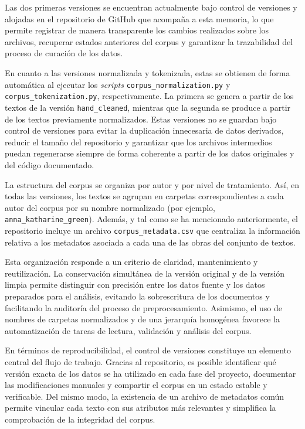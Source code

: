 \documentclass[IB]{TFUOC}%
\begin{document}
Las dos primeras versiones se encuentran actualmente bajo control de versiones y alojadas en el repositorio de GitHub que acompaña a esta memoria, lo que permite registrar de manera transparente los cambios realizados sobre los archivos, recuperar estados anteriores del corpus y garantizar la trazabilidad del proceso de curación de los datos.

En cuanto a las versiones normalizada y tokenizada, estas se obtienen de forma automática al ejecutar los \textit{scripts} \texttt{corpus\_normalization.py} y \texttt{corpus\_tokenization.py}, respectivamente. La primera se genera a partir de los textos de la versión \texttt{hand\_cleaned}, mientras que la segunda se produce a partir de los textos previamente normalizados. Estas versiones no se guardan bajo control de versiones para evitar la duplicación innecesaria de datos derivados, reducir el tamaño del repositorio y garantizar que los archivos intermedios puedan regenerarse siempre de forma coherente a partir de los datos originales y del código documentado.

La estructura del corpus se organiza por autor y por nivel de tratamiento. Así, en todas las versiones, los textos se agrupan en carpetas correspondientes a cada autor del corpus por su nombre normalizado (por ejemplo, \texttt{anna\_katharine\_green}). Además, y tal como se ha mencionado anteriormente, el repositorio incluye un archivo \texttt{corpus\_metadata.csv} que centraliza la información relativa a los metadatos asociada a cada una de las obras del conjunto de textos.

Esta organización responde a un criterio de claridad, mantenimiento y reutilización. La conservación simultánea de la versión original y de la versión limpia permite distinguir con precisión entre los datos fuente y los datos preparados para el análisis, evitando la sobrescritura de los documentos y facilitando la auditoría del proceso de preprocesamiento. Asimismo, el uso de nombres de carpetas normalizados y de una jerarquía homogénea favorece la automatización de tareas de lectura, validación y análisis del corpus.

En términos de reproducibilidad, el control de versiones constituye un elemento central del flujo de trabajo. Gracias al repositorio, es posible identificar qué versión exacta de los datos se ha utilizado en cada fase del proyecto, documentar las modificaciones manuales y compartir el corpus en un estado estable y verificable. Del mismo modo, la existencia de un archivo de metadatos común permite vincular cada texto con sus atributos más relevantes y simplifica la comprobación de la integridad del corpus.
\end{document}
